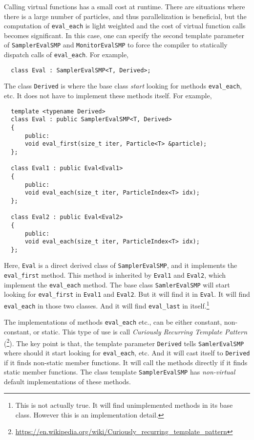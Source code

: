 Calling virtual functions has a small cost at runtime. There are situations
where there is a large number of particles, and thus parallelization is
beneficial, but the computation of \verb|eval_each| is light weighted and the
cost of virtual function calls becomes significant. In this case, one can
specify the second template parameter of \verb|SamplerEvalSMP| and
\verb|MonitorEvalSMP| to force the compiler to statically dispatch calls of
\verb|eval_each|. For example,
\begin{Verbatim}
  class Eval : SamplerEvalSMP<T, Derived>;
\end{Verbatim}
The class \verb|Derived| is where the base class \emph{start} looking for
methods \verb|eval_each|, etc. It does not have to implement these methods
itself. For example,
\begin{Verbatim}
  template <typename Derived>
  class Eval : public SamplerEvalSMP<T, Derived>
  {
      public:
      void eval_first(size_t iter, Particle<T> &particle);
  };

  class Eval1 : public Eval<Eval1>
  {
      public:
      void eval_each(size_t iter, ParticleIndex<T> idx);
  };

  class Eval2 : public Eval<Eval2>
  {
      public:
      void eval_each(size_t iter, ParticleIndex<T> idx);
  };
\end{Verbatim}
Here, \verb|Eval| is a direct derived class of \verb|SamplerEvalSMP|, and it
implements the \verb|eval_first| method. This method is inherited by
\verb|Eval1| and \verb|Eval2|, which implement the \verb|eval_each| method. The
base class \verb|SamlerEvalSMP| will start looking for \verb|eval_first| in
\verb|Eval1| and \verb|Eval2|. But it will find it in \verb|Eval|. It will
find \verb|eval_each| in those two classes. And it will find \verb|eval_last|
in itself.\footnote{This is not actually true. It will find unimplemented
  methods in its base class. However this is an implementation detail.}

The implementations of methods \verb|eval_each| etc., can be either constant,
non-constant, or static. This type of use is call \emph{Curiously Recurring
  Template Pattern} (\crtp\footnote{%
  \url{https://en.wikipedia.org/wiki/Curiously_recurring_template_pattern}}).
The key point is that, the template parameter \verb|Derived| tells
\verb|SamlerEvalSMP| where should it start looking for \verb|eval_each|, etc.
And it will cast itself to \verb|Derived| if it finds non-static member
functions. It will call the methods directly if it finds static member
functions. The class template \verb|SamplerEvalSMP| has \emph{non-virtual}
default implementations of these methods.

